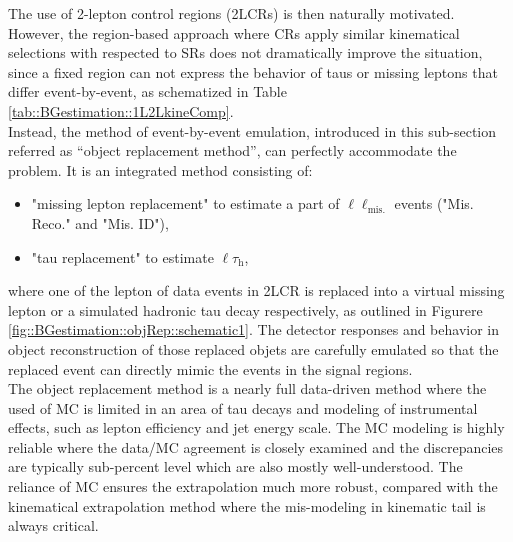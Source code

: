The use of 2-lepton control regions (2LCRs) is then naturally motivated. However, the region-based approach where CRs apply similar kinematical selections with respected to SRs does not dramatically improve the situation, since a fixed region can not express the behavior of taus or missing leptons that differ event-by-event, as schematized in Table \ref{tab::BGestimation::1L2LkineComp}. \\

Instead, the method of event-by-event emulation, introduced in this sub-section referred as ``object replacement method'', can perfectly accommodate the problem. 
It is an integrated method consisting of:
\begin{itemize}
\item "missing lepton replacement" to estimate a part of $\ell\ell_{\mathrm{mis.}}$ events ("Mis. Reco." and "Mis. ID"),
\item "tau replacement" to estimate $\ell\tau_{\mathrm{h}}$,
\end{itemize}
where one of the lepton of data events in 2LCR is replaced into a virtual missing lepton or a simulated hadronic tau decay respectively, as outlined in Figurere \ref{fig::BGestimation::objRep::schematic1}. 
The detector responses and behavior in object reconstruction of those replaced objets are carefully emulated so that the replaced event can directly mimic the events in the signal regions.   \\


%
The object replacement method is a nearly full data-driven method where the used of MC is limited in an area of tau decays and modeling of instrumental effects, such as lepton efficiency and jet energy scale.
The MC modeling is highly reliable where the data/MC agreement is closely examined and the discrepancies are typically sub-percent level which are also mostly well-understood. 
The reliance of MC ensures the extrapolation much more robust, compared with the kinematical extrapolation method where the mis-modeling in kinematic tail is always critical. \\

